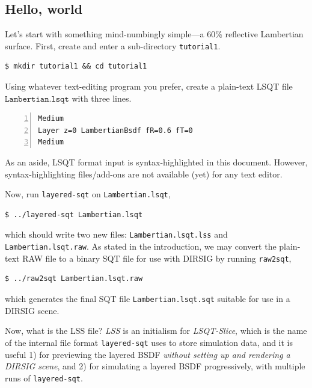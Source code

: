 \documentclass[
    twoside,
    twocolumn,
    letterpaper,
    10pt]{article}
\begin{document}
\subsection{Hello, world}
\label{sec:tutorial1}

Let's start with something mind-numbingly simple---a 60\% 
reflective Lambertian surface. First, create and enter a 
sub-directory \texttt{tutorial1}.
\begin{verbatim}
$ mkdir tutorial1 && cd tutorial1
\end{verbatim}
Using whatever text-editing program you prefer, create a 
plain-text LSQT file $\texttt{Lambertian.lsqt}$ with three lines.
\begin{lstlisting}[numbers=left]
Medium
Layer z=0 LambertianBsdf fR=0.6 fT=0
Medium
\end{lstlisting}
As an aside, LSQT format input is syntax-highlighted in this 
document. However, syntax-highlighting files/add-ons are not
available (yet) for any text editor.

Now, run \texttt{layered-sqt} on \texttt{Lambertian.lsqt}, 
\begin{verbatim}
$ ../layered-sqt Lambertian.lsqt
\end{verbatim}
which should write two new files: \texttt{Lambertian.lsqt.lss} and
\texttt{Lambertian.lsqt.raw}. As stated in the introduction, we may
convert the plain-text RAW file to a binary SQT file for use with 
DIRSIG by running \texttt{raw2sqt},
\begin{verbatim}
$ ../raw2sqt Lambertian.lsqt.raw
\end{verbatim}
which generates the final SQT file \texttt{Lambertian.lsqt.sqt}
suitable for use in a DIRSIG scene.

Now, what is the LSS file?
\emph{LSS} is an initialism for \emph{LSQT-Slice}, which is the
name of the internal file format \texttt{layered-sqt} uses to store 
simulation data, and it is useful 1) for previewing the layered BSDF
\emph{without setting up and rendering a DIRSIG scene}, and 2) for
simulating a layered BSDF progressively, with multiple runs of 
\texttt{layered-sqt}.
\end{document}
